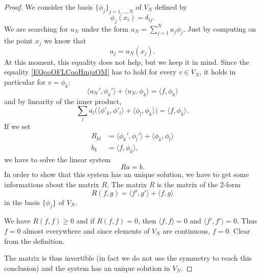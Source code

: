 \begin{proof}
    We consider the basis \( \{ \phi_j \}_{j=1,\ldots, N}\) of \( V_N\) defined by
    \begin{equation}
        \phi_j(x_i)=\delta_{ij}.
    \end{equation}
    We are searching for \( u_N\) under the form \( u_N=\sum_{j=1}^Na_j\phi_j\). Just by computing on the point \( x_j\) we know that
    \begin{equation}
        a_j=u_N(x_j).
    \end{equation}
    At this moment, this equality does not help, but we keep it in mind. Since the equality \eqref{EQooOFLCooHmjaOM} has to hold for every \( v \in V_N\), it holds in particular for \( v=\phi_k\):
    \begin{equation}
        \langle u_N', \phi_k'\rangle +\langle u_N, \phi_k\rangle =\langle f, \phi_k\rangle
    \end{equation}
    and by linearity of the inner product,
    \begin{equation}
        \sum_la_l\big( \langle \phi'_k, \phi'_l\rangle +\langle \phi_l, \phi_k\rangle  \big)=\langle f, \phi_k\rangle .
    \end{equation}
    If we set
    \begin{subequations}
        \begin{align}
            R_{kl}&=\langle \phi_k', \phi_l'\rangle +\langle \phi_k, \phi_l\rangle \\
            b_k&=\langle f, \phi_k\rangle,
        \end{align}
    \end{subequations}
    we have to solve the linear system
    \begin{equation}
        Ra=b.
    \end{equation}
    In order to show that this system has an unique solution, we have to get some informations about the matrix \( R\). The matrix \( R\) is the matrix of the \( 2\)-form
    \begin{equation}
        R(f,g)=\langle f', g'\rangle +\langle f, g\rangle
    \end{equation}
    in the basis \( \{ \phi_j \}\) of \( V_N\).

    \begin{subproof}
            We have \( R(f,f)\geq 0\) and if \( R(f,f)=0\), then \( \langle f, f\rangle =0\) and \( \langle f', f'\rangle =0\). Thus \( f=0\) almost everywhere and since elements of \( V_N\) are continuous, \( f=0\).
        \spitem[\( R\) is symmetric] Clear from the definition.
    \end{subproof}

    The matrix is thus invertible (in fact we do not use the symmetry to reach this conclusion) and the system has an unique solution in \( V_N\).

\end{proof}

